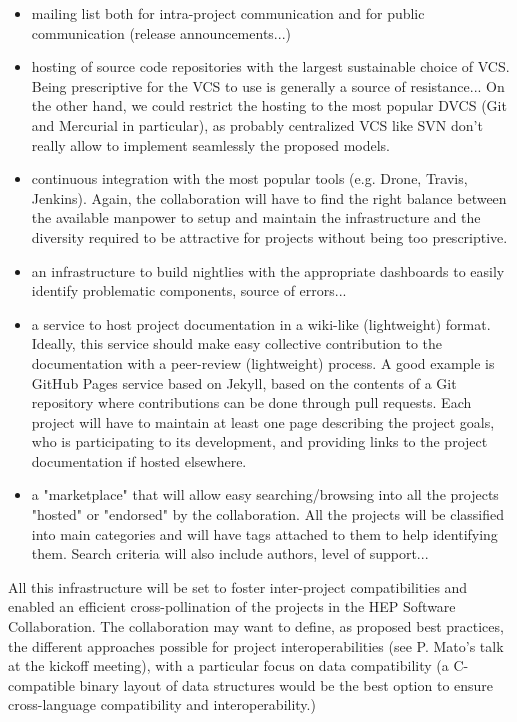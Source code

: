 \documentclass[11pt]{article} %
\begin{document}
\begin{itemize}

\item mailing list both for intra-project communication and for public communication (release announcements...)

\item hosting of source code repositories with the largest sustainable choice of VCS. Being prescriptive for the VCS
to use is generally a source of resistance... On the other hand, we could restrict the hosting to the most popular DVCS
(Git and Mercurial in particular), as probably centralized VCS like SVN don't really allow to implement seamlessly the
proposed models.

\item continuous integration with the most popular tools (e.g. Drone, Travis, Jenkins). Again, the collaboration will
have to find the right balance between the available manpower to setup and maintain the infrastructure and the diversity
required to be attractive for projects without being too prescriptive.

\item an infrastructure to build nightlies with the appropriate dashboards to easily identify problematic components,
source of errors...

\item a service to host project documentation in a wiki-like (lightweight) format. Ideally, this
service should make easy collective contribution to the documentation with a peer-review (lightweight) process. A good example
is GitHub Pages service based on Jekyll, based on the contents of a Git repository where contributions can be done through pull
requests. Each project will have to maintain at least one page describing the project goals, who is participating to its
development, and providing links to the project documentation if hosted elsewhere.

\item a "marketplace" that will allow easy searching/browsing into all the projects "hosted" or "endorsed" by the collaboration.
All the projects will be classified into main categories and will have tags attached to them to help identifying them. Search
criteria will also include authors, level of support...

\end{itemize}

All this infrastructure will be set to foster inter-project compatibilities and enabled an efficient cross-pollination of
the projects in the HEP Software Collaboration. The collaboration may want to define, as proposed best practices, the different
approaches possible for project interoperabilities (see P. Mato's talk at the kickoff meeting), with a particular focus on
data compatibility (a C-compatible binary layout of data structures
would be the best option to ensure cross-language compatibility and interoperability.)
\end{document}

